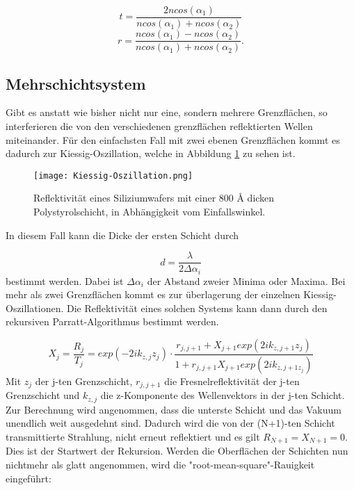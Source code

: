 \begin{equation}
    t = \frac{2 n cos(\alpha_1)}{n cos(\alpha_1) + n cos(\alpha_2)}
\end{equation}
\begin{equation}
    r = \frac{n cos(\alpha_1) - n cos(\alpha_2)}{n cos(\alpha_1) + n cos(\alpha_2)}.
\end{equation}


\subsection{Mehrschichtsystem}
Gibt es anstatt wie bisher nicht nur eine, sondern mehrere Grenzflächen, so interferieren die von den verschiedenen grenzflächen reflektierten Wellen miteinander.
Für den einfachsten Fall mit zwei ebenen Grenzflächen kommt es dadurch zur Kiessig-Oszillation, welche in Abbildung \ref{fig:Kiessig-Oszillation} zu sehen ist.

\begin{figure}
    \centering
    \label{fig:Kiessig-Oszillation}
    \texttt{[image: Kiessig-Oszillation.png]}
    \caption{Reflektivität eines Siliziumwafers mit einer 800 Å dicken Polystyrolschicht, in Abhängigkeit vom Einfallswinkel. \cite{Anleitungalt}}
\end{figure}

In diesem Fall kann die Dicke der ersten Schicht durch 

\begin{equation}
    d = \frac{\lambda}{2 \Delta \alpha_i}
\end{equation}
bestimmt werden. Dabei ist $\Delta \alpha_i$ der Abstand zweier Minima oder Maxima.
Bei mehr als zwei Grenzflächen kommt es zur überlagerung der einzelnen Kiessig-Oszillationen. 
Die Reflektivität eines solchen Systems kann dann durch den rekursiven Parratt-Algorithmus bestimmt werden.

\begin{equation}
    X_j = \frac{R_j}{T_j} = exp(-2i k_{z,j} z_j) \cdot \frac{r_{j,j+1} + X_{j+1} exp(2i k_{z,j+1} z_j) }{1 + r_{j,j+1} X_{j+1} exp(2i k_{z,j+1 z_j})}
\end{equation}
Mit $z_j$ der j-ten Grenzschicht, $r_{j,j+1}$ die Fresnelreflektivität der j-ten Grenzschicht und $k_{z,j}$ die z-Komponente des Wellenvektors in der j-ten Schicht.
Zur Berechnung wird angenommen, dass die unterste Schicht und das Vakuum unendlich weit ausgedehnt sind. Dadurch wird die von der (N+1)-ten Schicht transmittierte 
Strahlung, nicht erneut reflektiert und es gilt $R_{N+1} = X_{N+1} = 0$.
Dies ist der Startwert der Rekursion.
Werden die Oberflächen der Schichten nun nichtmehr als glatt angenommen, wird die "root-mean-square"-Rauigkeit eingeführt:

